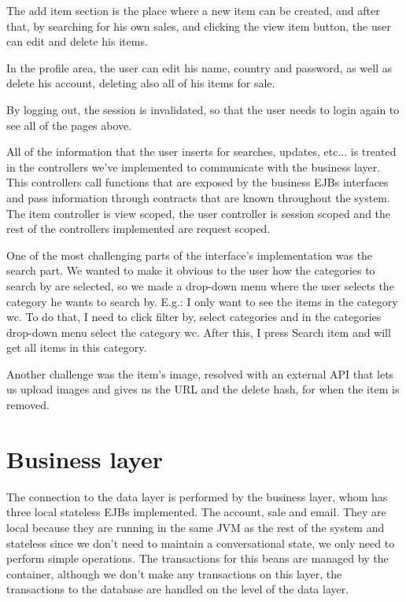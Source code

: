 \documentclass{article}
\begin{document}
\qquad The add item section is the place where a new item can be created, and after that, by searching for his own sales, and clicking the view item button, the user can edit and delete his items.

\qquad In the profile area, the user can edit his name, country and password, as well as delete his account, deleting also all of his items for sale.

\qquad By logging out, the session is invalidated, so that the user needs to login again to see all of the pages above. 

\qquad All of the information that the user inserts for searches, updates, etc... is treated in the controllers we've implemented to communicate with the business layer. This controllers call functions that are exposed by the business \ac{EJB}s interfaces and pass information through contracts that are known throughout the system. The item controller is view scoped, the user controller is session scoped and the rest of the controllers implemented are request scoped. 

\qquad One of the most challenging parts of the interface's implementation was the search part. We wanted to make it obvious to the user how the categories to search by are selected, so we made a drop-down menu where the user selects the category he wants to search by. E.g.: I only want to see the items in the category wc. To do that, I need to click filter by, select categories and in the categories drop-down menu select the category wc. After this, I press Search item and will get all items in this category.

\qquad Another challenge was the item's image, resolved with an external API that lets us upload images and gives us the URL and the delete hash, for when the item is removed.



\section{Business layer}

\qquad The connection to the data layer is performed by the business layer, whom has three local stateless \ac{EJB}s implemented. The account, sale and email. They are local because they are running in the same \ac{JVM} as the rest of the system and stateless since we don't need to maintain a conversational state, we only need to perform simple operations. The transactions for this beans are managed by the container, although we don't make any transactions on this layer, the transactions to the database are handled on the level of the data layer.
\end{document}
